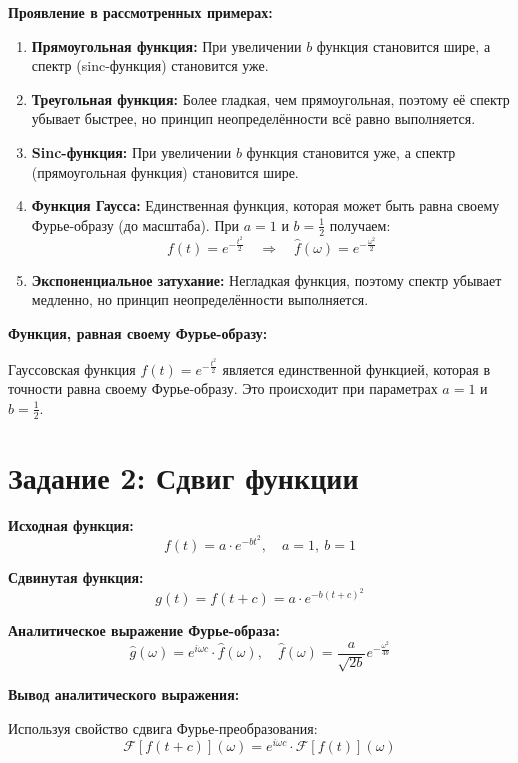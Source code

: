 \textbf{Проявление в рассмотренных примерах:}

\begin{enumerate}
    \item \textbf{Прямоугольная функция:} При увеличении $b$ функция становится шире, а спектр (sinc-функция) становится уже.
    
    \item \textbf{Треугольная функция:} Более гладкая, чем прямоугольная, поэтому её спектр убывает быстрее, но принцип неопределённости всё равно выполняется.
    
    \item \textbf{Sinc-функция:} При увеличении $b$ функция становится уже, а спектр (прямоугольная функция) становится шире.
    
    \item \textbf{Функция Гаусса:} Единственная функция, которая может быть равна своему Фурье-образу (до масштаба). При $a = 1$ и $b = \frac{1}{2}$ получаем:
    \[
    f(t) = e^{-\frac{t^2}{2}} \quad \Rightarrow \quad \hat{f}(\omega) = e^{-\frac{\omega^2}{2}}
    \]
    
    \item \textbf{Экспоненциальное затухание:} Негладкая функция, поэтому спектр убывает медленно, но принцип неопределённости выполняется.
\end{enumerate}

\textbf{Функция, равная своему Фурье-образу:}

Гауссовская функция $f(t) = e^{-\frac{t^2}{2}}$ является единственной функцией, которая в точности равна своему Фурье-образу. Это происходит при параметрах $a = 1$ и $b = \frac{1}{2}$.

\section*{Задание 2: Сдвиг функции}

\textbf{Исходная функция:}
\[
f(t) = a \cdot e^{-b t^2}, \quad a = 1, \ b = 1
\]

\textbf{Сдвинутая функция:}
\[
g(t) = f(t + c) = a \cdot e^{-b (t + c)^2}
\]

\textbf{Аналитическое выражение Фурье-образа:}
\[
\hat{g}(\omega) = e^{i \omega c} \cdot \hat{f}(\omega), \quad \hat{f}(\omega) = \frac{a}{\sqrt{2b}} e^{-\frac{\omega^2}{4b}}
\]

\textbf{Вывод аналитического выражения:}

Используя свойство сдвига Фурье-преобразования:
\[
\mathcal{F}[f(t + c)](\omega) = e^{i \omega c} \cdot \mathcal{F}[f(t)](\omega)
\]

